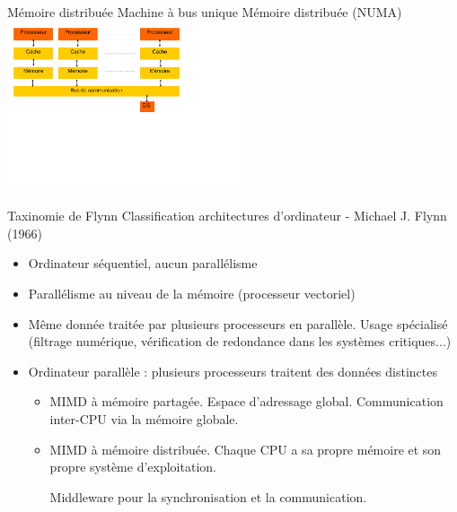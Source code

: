 \begin{frame}{Mémoire distribuée}
Machine à bus unique Mémoire distribuée (NUMA)
\includegraphics[height=5cm]{../illustration/para_mem_distri.pdf}
\end{frame}

\begin{frame}{Taxinomie de Flynn \cite{wp-flynn}}
Classification architectures d'ordinateur - Michael J. Flynn (1966)
\begin{itemize}
\item <1->[SISD] Ordinateur séquentiel, aucun parallélisme
\item <2->[SIMD] Parallélisme au niveau de la mémoire (processeur vectoriel)
\item <3->[MISD] Même donnée traitée par plusieurs processeurs en parallèle. Usage spécialisé (filtrage numérique, vérification de redondance dans les systèmes critiques...)
\item <4->[MIMD] Ordinateur parallèle : plusieurs processeurs traitent des données distinctes
\begin{itemize}
\item MIMD à mémoire partagée. Espace d'adressage global. Communication inter-CPU via la mémoire globale.
\item MIMD à mémoire distribuée. Chaque CPU a sa propre mémoire et son propre système d'exploitation.

Middleware pour la synchronisation et la communication. 
\end{itemize}
\end{itemize}
\end{frame}


